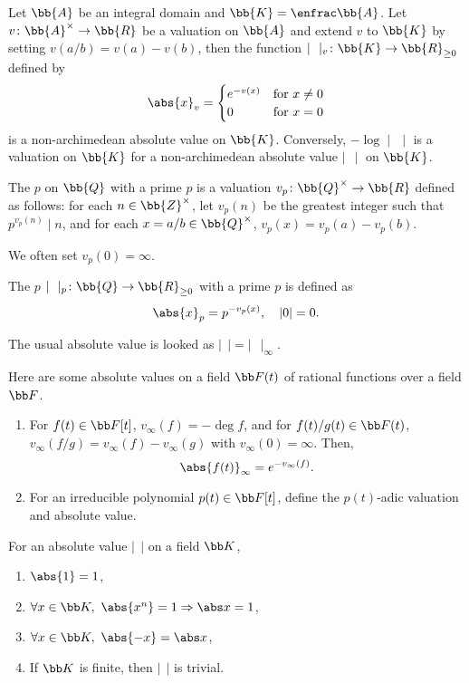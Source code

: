 Let $\bb{A}$ be an integral domain and $\bb{K} = \enfrac\bb{A}$. Let $v\colon \bb{A}^\times \to \bb{R}$ be a valuation on $\bb{A}$ and extend $v$ to $\bb{K}$ by setting $v(a/b) = v(a) - v(b)$, then the function $\mid\ \ \mid_v \colon \bb{K} \to \bb{R}_{\ge 0}$ defined by
\[
\abs{x}_v = \begin{cases}
 e^{-v(x)} & \text{for}\ x \neq 0 \\
 0 & \text{for}\ x = 0
 \end{cases}
 \] is a non-archimedean absolute value on $\bb{K}$. Conversely, $-\log \mid \,\ \mid$ is a valuation on $\bb{K}$ for a non-archimedean absolute value $\mid\ \ \mid$ on $\bb{K}$.


The $p$ on $\bb{Q}$ with a prime $p$ is a valuation $v_p \colon \bb{Q}^\times \to \bb{R}$ defined as follows: for each $n \in \bb{Z}^\times$, let $v_p(n)$ be the greatest integer such that $p^{v_p(n)} \mid n$, and for each $x = a / b \in \bb{Q}^\times$, $v_p(x) = v_p(a) - v_p(b)$.

We often set $v_p(0) = \infty$.

The $p$ $\mid\ \ \mid_p \colon \bb{Q} \to \bb{R}_{\ge0}$ with a prime $p$ is defined as
\[
\abs{x}_p = p^{-v_p(x)},\quad |0| = 0.
\]

The usual absolute value is looked as $\mid\ \ \mid = \mid\ \ \mid_\infty$.


Here are some absolute values on a field $\bb F(t)$ of rational functions over a field $\bb F$.

\begin{enumerate}
\item For $f(t) \in \bb F[t]$, $v_\infty (f) = -\deg f$, and for $f(t)/g(t) \in \bb F(t)$, $v_\infty (f/g) = v_\infty(f) - v_\infty (g)$ with $v_\infty (0) = \infty$. Then,
\[
\abs{f(t)}_\infty = e^{-v_\infty (f)}.
\]
\item For an irreducible polynomial $p(t) \in \bb F[t]$, define the $p(t)$-adic valuation and absolute value.
\end{enumerate}

For an absolute value $|\ \ |$ on a field $\bb K$,
\begin{enumerate}
\item $\abs{1} = 1$,
\item $\forall x \in \bb K,\ \abs{x^n} = 1 \Rightarrow \abs x = 1$,
\item $\forall x \in \bb K,\ \abs{-x} = \abs x$,
\item If $\bb K$ is finite, then $|\ \ |$ is trivial.
\end{enumerate}

